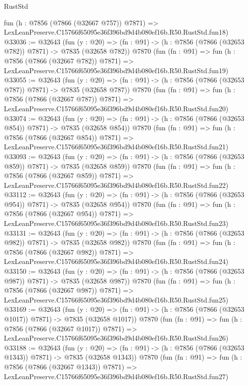 \begin{lexlean}{RustStd}
\begin{coremodule}
    fun (h : @7856 (@7866 (@32667 @757)) @7871) =>
    LexLeanPreserve.C15766f65095e36f396bd9d4b080ef16b.R50.RustStd.fun18)
@33036 := @32643
    (fun (y : @20) => (fn : @91) -> (h : @7856 (@7866 (@32653 @782)) @7871) -> @7835 (@32658 @782))
    @7870
    (fun (fn : @91) =>
    fun (h : @7856 (@7866 (@32667 @782)) @7871) =>
    LexLeanPreserve.C15766f65095e36f396bd9d4b080ef16b.R50.RustStd.fun19)
@33055 := @32643
    (fun (y : @20) => (fn : @91) -> (h : @7856 (@7866 (@32653 @787)) @7871) -> @7835 (@32658 @787))
    @7870
    (fun (fn : @91) =>
    fun (h : @7856 (@7866 (@32667 @787)) @7871) =>
    LexLeanPreserve.C15766f65095e36f396bd9d4b080ef16b.R50.RustStd.fun20)
@33074 := @32643
    (fun (y : @20) => (fn : @91) -> (h : @7856 (@7866 (@32653 @854)) @7871) -> @7835 (@32658 @854))
    @7870
    (fun (fn : @91) =>
    fun (h : @7856 (@7866 (@32667 @854)) @7871) =>
    LexLeanPreserve.C15766f65095e36f396bd9d4b080ef16b.R50.RustStd.fun21)
@33093 := @32643
    (fun (y : @20) => (fn : @91) -> (h : @7856 (@7866 (@32653 @859)) @7871) -> @7835 (@32658 @859))
    @7870
    (fun (fn : @91) =>
    fun (h : @7856 (@7866 (@32667 @859)) @7871) =>
    LexLeanPreserve.C15766f65095e36f396bd9d4b080ef16b.R50.RustStd.fun22)
@33112 := @32643
    (fun (y : @20) => (fn : @91) -> (h : @7856 (@7866 (@32653 @954)) @7871) -> @7835 (@32658 @954))
    @7870
    (fun (fn : @91) =>
    fun (h : @7856 (@7866 (@32667 @954)) @7871) =>
    LexLeanPreserve.C15766f65095e36f396bd9d4b080ef16b.R50.RustStd.fun23)
@33131 := @32643
    (fun (y : @20) => (fn : @91) -> (h : @7856 (@7866 (@32653 @982)) @7871) -> @7835 (@32658 @982))
    @7870
    (fun (fn : @91) =>
    fun (h : @7856 (@7866 (@32667 @982)) @7871) =>
    LexLeanPreserve.C15766f65095e36f396bd9d4b080ef16b.R50.RustStd.fun24)
@33150 := @32643
    (fun (y : @20) => (fn : @91) -> (h : @7856 (@7866 (@32653 @987)) @7871) -> @7835 (@32658 @987))
    @7870
    (fun (fn : @91) =>
    fun (h : @7856 (@7866 (@32667 @987)) @7871) =>
    LexLeanPreserve.C15766f65095e36f396bd9d4b080ef16b.R50.RustStd.fun25)
@33169 := @32643
    (fun (y : @20) =>
    (fn : @91) -> (h : @7856 (@7866 (@32653 @1017)) @7871) -> @7835 (@32658 @1017))
    @7870
    (fun (fn : @91) =>
    fun (h : @7856 (@7866 (@32667 @1017)) @7871) =>
    LexLeanPreserve.C15766f65095e36f396bd9d4b080ef16b.R50.RustStd.fun26)
@33188 := @32643
    (fun (y : @20) =>
    (fn : @91) -> (h : @7856 (@7866 (@32653 @1343)) @7871) -> @7835 (@32658 @1343))
    @7870
    (fun (fn : @91) =>
    fun (h : @7856 (@7866 (@32667 @1343)) @7871) =>
    LexLeanPreserve.C15766f65095e36f396bd9d4b080ef16b.R50.RustStd.fun27)

\end{coremodule}
\end{lexlean}
